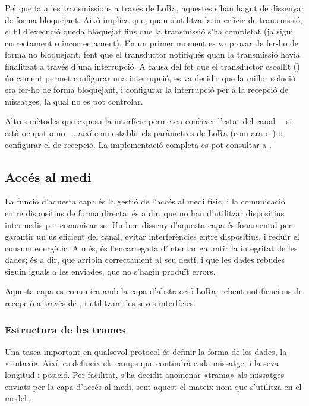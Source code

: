 \documentclass{tfgitic}[2024/07/01]
\begin{document}
Pel que fa a les transmissions a través de LoRa, aquestes s'han hagut de dissenyar de forma bloquejant. Això implica que, quan s'utilitza la interfície de transmissió, el fil d'execució queda bloquejat fins que la transmissió s'ha completat (ja sigui correctament o incorrectament). En un primer moment es va provar de fer-ho de forma no bloquejant, fent que el transductor notifiqués quan la transmissió havia finalitzat a través d'una interrupció. A causa del fet que el transductor escollit () únicament permet configurar una interrupció, es va decidir que la millor solució era fer-ho de forma bloquejant, i configurar la interrupció per a la recepció de missatges, la qual no es pot controlar.

Altres mètodes que exposa la interfície permeten conèixer l'estat del canal ---si està ocupat o no---, així com establir els paràmetres de LoRa (com ara  o ) o configurar el  de recepció. La implementació completa es pot consultar a .

\subsection{Accés al medi}
La funció d'aquesta capa és la gestió de l'accés al medi físic, i la comunicació entre dispositius de forma directa; és a dir, que no han d'utilitzar dispositius intermedis per comunicar-se. Un bon disseny d'aquesta capa és fonamental per garantir un ús eficient del canal, evitar interferències entre dispositius, i reduir el consum energètic. A més, és l'encarregada d'intentar garantir la integritat de les dades; és a dir, que arribin correctament al seu destí, i que les dades rebudes siguin iguals a les enviades, que no s'hagin produït errors. 

Aquesta capa es comunica amb la capa d'abstracció LoRa, rebent notificacions de recepció a través de , i utilitzant les seves interfícies.

\subsubsection{Estructura de les trames}
Una tasca important en qualsevol protocol és definir la forma de les dades, la «sintaxi». Així, es defineix els camps que contindrà cada missatge, i la seva longitud i posició. Per facilitat, s'ha decidit anomenar «trama» als missatges enviats per la capa d'accés al medi, sent aquest el mateix nom que s'utilitza en el model .
\end{document}
